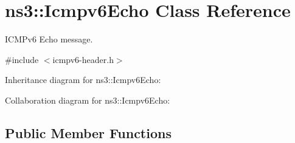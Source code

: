 \hypertarget{classns3_1_1Icmpv6Echo}{}\section{ns3\+:\+:Icmpv6\+Echo Class Reference}
\label{classns3_1_1Icmpv6Echo}


I\+C\+M\+Pv6 Echo message.  




{\ttfamily \#include $<$icmpv6-\/header.\+h$>$}



Inheritance diagram for ns3\+:\+:Icmpv6\+Echo\+:


Collaboration diagram for ns3\+:\+:Icmpv6\+Echo\+:
\subsection*{Public Member Functions}
